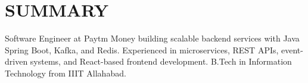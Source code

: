 % 
\vspace{2pt}
\section{\large \textbf{SUMMARY}}
Software Engineer at Paytm Money building scalable backend services with Java Spring Boot, Kafka, and Redis. Experienced in microservices, REST APIs, event-driven systems, and React-based frontend development. B.Tech in Information Technology from IIIT Allahabad.
